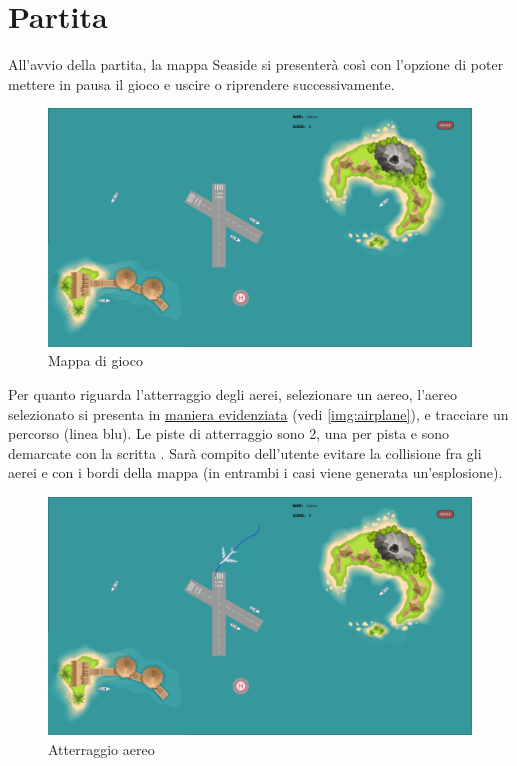 \documentclass[a4paper,12pt]{report}
\begin{document}
\clearpage

\section*{Partita}
All'avvio della partita, la mappa Seaside si presenterà così con l'opzione di poter mettere in pausa il gioco e uscire o riprendere successivamente.
\begin{figure}[H]
    \begin{center}
        \centering
        \includegraphics[width=\textwidth]{img/GuidaUtente/Seaside.png}
    \end{center}
    \caption{Mappa di gioco}
    \label{img:seaside}
\end{figure}

\clearpage

\noindent Per quanto riguarda l'atterraggio degli aerei, selezionare un aereo, l'aereo selezionato si presenta in \underline{maniera evidenziata} (vedi \figurename{ \ref{img:airplane}}), e tracciare un percorso (linea blu). Le piste di atterraggio sono 2, una per pista e sono demarcate con la scritta . Sarà compito dell'utente evitare la collisione fra gli aerei e con i bordi della mappa (in entrambi i casi viene generata un'esplosione).
\begin{figure}[H]
    \begin{center}
        \centering
        \includegraphics[width=\textwidth]{img/GuidaUtente/Landing.png}
    \end{center}
    \caption{Atterraggio aereo}
    \label{img:landing}
\end{figure}
\end{document}
